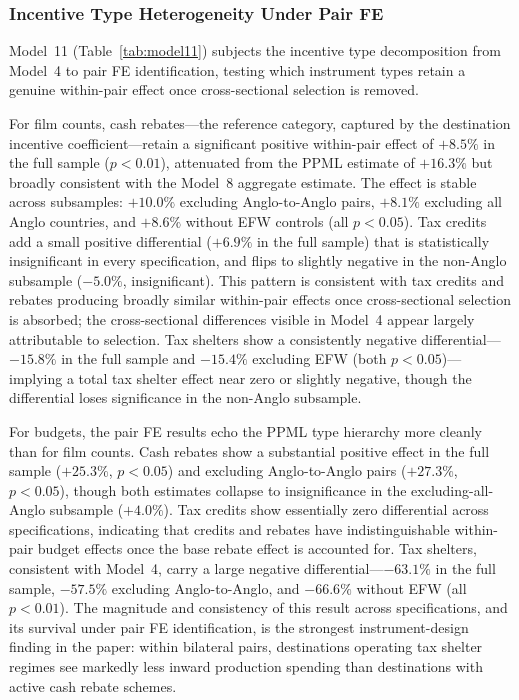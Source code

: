 \subsubsection{Incentive Type Heterogeneity Under Pair FE}

Model~11 (Table~\ref{tab:model11}) subjects the incentive type decomposition from Model~4 to pair FE identification, testing which instrument types retain a genuine within-pair effect once cross-sectional selection is removed.

For film counts, cash rebates---the reference category, captured by the destination incentive coefficient---retain a significant positive within-pair effect of $+8.5\%$ in the full sample ($p < 0.01$), attenuated from the PPML estimate of $+16.3\%$ but broadly consistent with the Model~8 aggregate estimate. The effect is stable across subsamples: $+10.0\%$ excluding Anglo-to-Anglo pairs, $+8.1\%$ excluding all Anglo countries, and $+8.6\%$ without EFW controls (all $p < 0.05$). Tax credits add a small positive differential ($+6.9\%$ in the full sample) that is statistically insignificant in every specification, and flips to slightly negative in the non-Anglo subsample ($-5.0\%$, insignificant). This pattern is consistent with tax credits and rebates producing broadly similar within-pair effects once cross-sectional selection is absorbed; the cross-sectional differences visible in Model~4 appear largely attributable to selection. Tax shelters show a consistently negative differential---$-15.8\%$ in the full sample and $-15.4\%$ excluding EFW (both $p < 0.05$)---implying a total tax shelter effect near zero or slightly negative, though the differential loses significance in the non-Anglo subsample.

For budgets, the pair FE results echo the PPML type hierarchy more cleanly than for film counts. Cash rebates show a substantial positive effect in the full sample ($+25.3\%$, $p < 0.05$) and excluding Anglo-to-Anglo pairs ($+27.3\%$, $p < 0.05$), though both estimates collapse to insignificance in the excluding-all-Anglo subsample ($+4.0\%$). Tax credits show essentially zero differential across specifications, indicating that credits and rebates have indistinguishable within-pair budget effects once the base rebate effect is accounted for. Tax shelters, consistent with Model~4, carry a large negative differential---$-63.1\%$ in the full sample, $-57.5\%$ excluding Anglo-to-Anglo, and $-66.6\%$ without EFW (all $p < 0.01$). The magnitude and consistency of this result across specifications, and its survival under pair FE identification, is the strongest instrument-design finding in the paper: within bilateral pairs, destinations operating tax shelter regimes see markedly less inward production spending than destinations with active cash rebate schemes.

